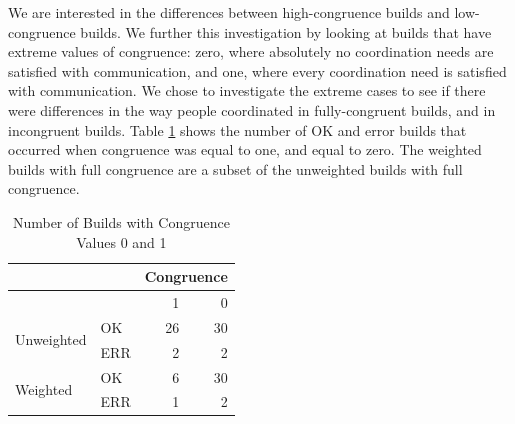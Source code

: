 \documentclass[12pt,oneside]{book}
\begin{document}
We are interested in the differences between high-congruence builds and low-congruence builds.
We further this investigation by looking at builds that have extreme values of congruence: zero, where absolutely no coordination needs are satisfied with communication, and one, where every coordination need is satisfied with communication.
We chose to investigate the extreme cases to see if there were differences in the way people coordinated in fully-congruent builds, and in incongruent builds.
Table \ref{tab:congruence_extremes} shows the number of OK and error builds that occurred when congruence was equal to one, and equal to zero. The weighted builds with full congruence are a subset of the unweighted builds with full congruence.



\begin{table}[t]
\centering
\begin{tabular}{ll|rr}
& & \multicolumn{2}{c}{Congruence} \\\hline
&  & 1 & 0 \\\hline 
\multirow{2}{*}{Unweighted} & OK & 26 & 30 \\
                            & ERR & 2 & 2 \\\hline
\multirow{2}{*}{Weighted} & OK & 6 & 30 \\
                         & ERR & 1 & 2 \\
\end{tabular}
\caption{Number of Builds with Congruence Values 0 and 1}
\label{tab:congruence_extremes}
\end{table}
\end{document}
